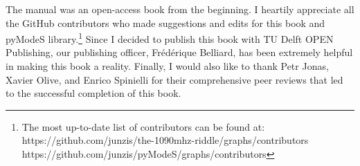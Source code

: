 {The manual was an open-access book from the beginning. I heartily appreciate all the GitHub contributors who made suggestions and edits for this book and pyModeS library.\footnote{The most up-to-date list of contributors can be found at: \\https://github.com/junzis/the-1090mhz-riddle/graphs/contributors \\https://github.com/junzis/pyModeS/graphs/contributors} Since I decided to publish this book with TU Delft OPEN Publishing, our publishing officer, Fr\'ed\'erique Belliard, has been extremely helpful in making this book a reality. Finally, I would also like to thank Petr Jonas, Xavier Olive, and Enrico Spinielli for their comprehensive peer reviews that led to the successful completion of this book.
}
